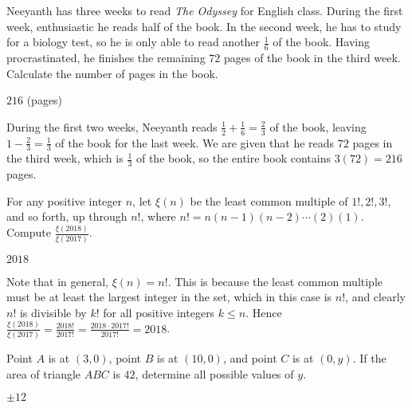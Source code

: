 \documentclass[11pt]{article}
\begin{document}
\begin{problem}
Neeyanth has three weeks to read \textit{The Odyssey} for English class. During the first week, 
enthusiastic he reads half of the book. In the second week, he has to study for a biology test, 
so he is only able to read another $\frac{1}{6}$ of the book. Having procrastinated, 
he finishes the remaining $72$ pages of the book in the third week. Calculate the number of pages in the book.
\end{problem}

\begin{answer}
$\boxed{216}$ (pages)
\end{answer}

\begin{solution}
During the first two weeks, Neeyanth reads $\frac{1}{2} + \frac{1}{6} = \frac{2}{3}$ of the book, leaving
$1 - \frac{2}{3} = \frac{1}{3}$ of the book for the last week. We are given that he reads $72$ pages in
the third week, which is $\frac{1}{3}$ of the book, so the entire book contains $3(72) = \boxed{216}$ pages.
\end{solution}


\begin{problem}%
For any positive integer $n$, let $\xi(n)$ be the least common multiple of $1!, 2!, 3!$, and so
forth, up through $n!$, where $n! = n(n-1)(n-2) \cdots (2)(1)$. Compute $\frac{\xi(2018)}{\xi(2017)}$.
\end{problem}

\begin{answer}
$\boxed{2018}$
\end{answer}

\begin{solution}
Note that in general, $\xi(n) = n!$. This is because the least common multiple must be at least
the largest integer in the set, which in this case is $n!$, and clearly $n!$ is divisible
by $k!$ for all positive integers $k \le n$. Hence $\frac{\xi(2018)}{\xi(2017)} =
\frac{2018!}{2017!} = \frac{2018 \cdot 2017!}{2017!} = \boxed{2018}$.
\end{solution}


\begin{problem}
Point $A$ is at $(3, 0)$, point $B$ is at $(10, 0)$, and point $C$ is at $(0, y)$.
If the area of triangle $ABC$ is $42$, determine all possible values of $y$.
\end{problem}

\begin{answer}
$\boxed{\pm 12}$
\end{answer}
\end{document}
